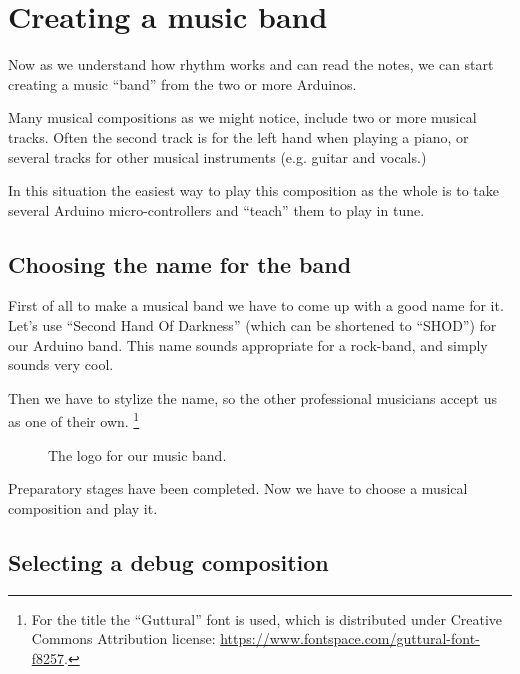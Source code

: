 \documentclass[../sparc.tex]{subfiles}
\begin{document}
\newpage
\section{Creating a music band}

Now as we understand how rhythm works and can read the notes, we can start
creating a music ``band'' from the two or more Arduinos.

Many musical compositions as we might notice, include two or more musical
tracks.  Often the second track is for the left hand when playing a piano, or
several tracks for other musical instruments (e.g. guitar and vocals.)

In this situation the easiest way to play this composition as the whole is to
take several Arduino micro-controllers and ``teach'' them to play in tune.

\subsection{Choosing the name for the band}

First of all to make a musical band we have to come up with a good name for it.
Let's use ``Second Hand Of Darkness'' (which can be shortened to ``SHOD'') for
our Arduino band.  This name sounds appropriate for a rock-band, and simply
sounds very cool.

Then we have to stylize the name, so the other professional musicians accept us
as one of their own. \footnote{For the title the ``Guttural'' font is used,
which is distributed under Creative Commons Attribution license:
\url{https://www.fontspace.com/guttural-font-f8257}.}

\begin{figure}[ht]
  \centering
  
  \caption{The logo for our music band.}
  \label{fig:shod-band-logo}
\end{figure}

Preparatory stages have been completed.  Now we have to choose a musical
composition and play it.

\subsection{Selecting a debug composition}
\end{document}
